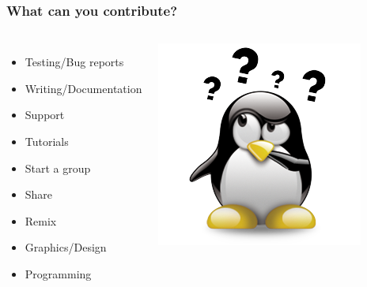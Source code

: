 \documentclass{beamer}
\begin{document}
\begin{frame}
  \frametitle{What can you contribute?}
  \begin{columns}[c]
    \begin{itemize}
    \item \textcolor<2>{beamer@mygrey}{Testing/Bug reports}
    \item \textcolor<2>{beamer@mygrey}{Writing/Documentation}
    \item \textcolor<2>{beamer@mygrey}{Support}
    \item \textcolor<2>{beamer@mygrey}{Tutorials}
    \item \textcolor<2>{beamer@mygrey}{Start a group}
    \item \textcolor<2>{beamer@mygrey}{Share}
    \item \textcolor<2>{beamer@mygrey}{Remix}
    \item \textcolor<2>{beamer@mygrey}{Graphics/Design}
    \item \textcolor<2>{beamer@myblue}{Programming}
    \end{itemize}
    \includegraphics[width=1\textwidth]{../img/tux-question-3}
  \end{columns}
\end{frame}
\end{document}
